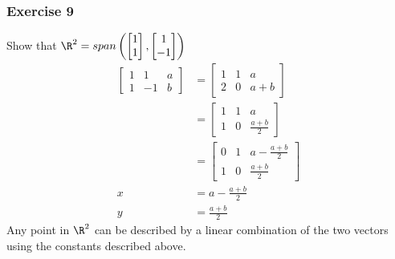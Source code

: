 \documentclass{math}
\begin{document}
\subsubsection*{Exercise 9}
Show that \( \R^2 = span\left(\begin{bmatrix}1 \\ 1\end{bmatrix},
\begin{bmatrix}1 \\ -1\end{bmatrix}\right) \)
\begin{align*}
  \begin{bmatrix}
    1 & 1 & a \\
    1 & -1 & b
  \end{bmatrix} &= \begin{bmatrix}
    1 & 1 & a \\
    2 & 0 & a+b
  \end{bmatrix} \\
  &= \begin{bmatrix}
    1 & 1 & a \\
    1 & 0 & \frac{a+b}{2}
  \end{bmatrix} \\
  &= \begin{bmatrix}
    0 & 1 & a-\frac{a+b}{2} \\
    1 & 0 & \frac{a+b}{2}
  \end{bmatrix} \\
  x &= a-\frac{a+b}{2} \\
  y &= \frac{a+b}{2}
\end{align*}
Any point in \( \R^2 \) can be described by a linear combination of the two
vectors using the constants described above.
\end{document}
